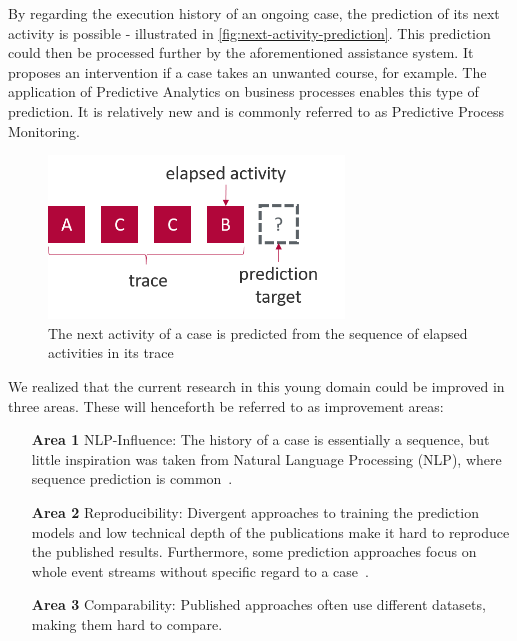 By regarding the execution history of an ongoing case, the prediction of its next activity is possible - illustrated in \autoref{fig:next-activity-prediction}. This prediction could then be processed further by the aforementioned assistance system. It proposes an intervention if a case takes an unwanted course, for example. The application of Predictive Analytics on business processes enables this type of prediction. It is relatively new and is commonly referred to as Predictive Process Monitoring.

\begin{figure}
    \centering
    \includegraphics[width=0.7\textwidth]{gfx/next-activity.png}
    \caption[Next-activity prediction from a trace]{The next activity of a case is predicted from the sequence of elapsed activities in its trace}
    \label{fig:next-activity-prediction}
\end{figure}

We realized that the current research in this young domain could be improved in three areas. These will henceforth be referred to as improvement areas:

\begin{enumerate}
  \item[\textbf{Area 1}] NLP-Influence: The history of a case is essentially a sequence, but little inspiration was taken from Natural Language Processing (NLP), where sequence prediction is common~\cite{shibata2016bipartite, kokkinos2017structural}.
  \item[\textbf{Area 2}] Reproducibility: Divergent approaches to training the prediction models and low technical depth of the publications make it hard to reproduce the published results. Furthermore, some prediction approaches focus on whole event streams without specific regard to a case~\cite{evermann2016, schoenig2018}.
  \item[\textbf{Area 3}] Comparability: Published approaches often use different datasets, making them hard to compare.
\end{enumerate}

